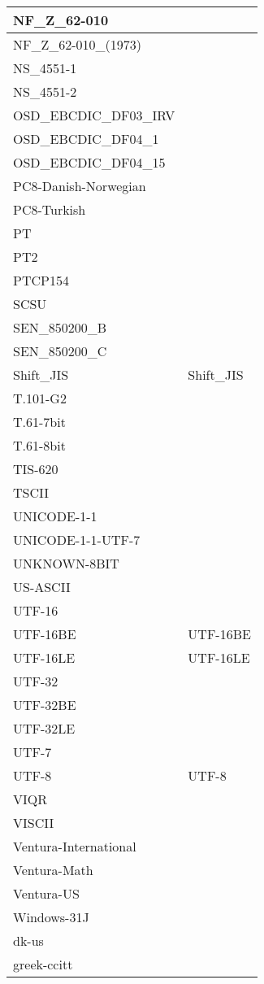 \documentclass{wg21}
\begin{document}
\begin{longtable}{| p{} | p{} |}
NF_Z_62-010 & \\ \hline
NF_Z_62-010_(1973) & \\ \hline
NS_4551-1 & \\ \hline
NS_4551-2 & \\ \hline
OSD_EBCDIC_DF03_IRV & \\ \hline
OSD_EBCDIC_DF04_1 & \\ \hline
OSD_EBCDIC_DF04_15 & \\ \hline
PC8-Danish-Norwegian & \\ \hline
PC8-Turkish & \\ \hline
PT & \\ \hline
PT2 & \\ \hline
PTCP154 & \\ \hline
SCSU & \\ \hline
SEN_850200_B & \\ \hline
SEN_850200_C & \\ \hline
Shift_JIS & Shift_JIS\\ \hline
T.101-G2 & \\ \hline
T.61-7bit & \\ \hline
T.61-8bit & \\ \hline
TIS-620 & \\ \hline
TSCII & \\ \hline
UNICODE-1-1 & \\ \hline
UNICODE-1-1-UTF-7 & \\ \hline
UNKNOWN-8BIT & \\ \hline
US-ASCII & \\ \hline
UTF-16 & \\ \hline
UTF-16BE & UTF-16BE\\ \hline
UTF-16LE & UTF-16LE\\ \hline
UTF-32 & \\ \hline
UTF-32BE & \\ \hline
UTF-32LE & \\ \hline
UTF-7 & \\ \hline
UTF-8 & UTF-8\\ \hline
VIQR & \\ \hline
VISCII & \\ \hline
Ventura-International & \\ \hline
Ventura-Math & \\ \hline
Ventura-US & \\ \hline
Windows-31J & \\ \hline
dk-us & \\ \hline
greek-ccitt & \\ \hline

\end{longtable}
\end{document}
